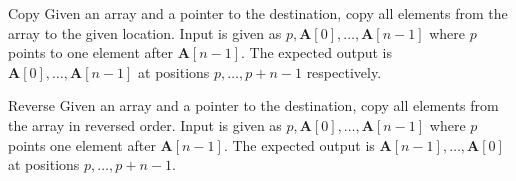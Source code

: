\documentclass[xcolor={usenames}]{beamer}
\begin{document}
  \begin{frame}{Copy}
  	Given an array and a pointer to the destination, copy all elements from the array to the given location. Input is given as $p, \textbf{A}[0], \dots, \textbf{A}[n-1]$ where $p$ points to one element after $\textbf{A}[n-1]$. The expected output is $\textbf{A}[0], \dots, \textbf{A}[n-1]$ at positions $p, \dots, p+n-1$ respectively.			
  	\begin{table}[h!]
		\centering
\end{table}
  \end{frame}
  \begin{frame}{Reverse}
  	Given an array and a pointer to the destination, copy all elements from the array in reversed order. Input is given as $p, \textbf{A}[0], \dots, \textbf{A}[n-1]$ where $p$ points one element after $\textbf{A}[n-1]$. The expected output is $\textbf{A}[n-1], \dots, \textbf{A}[0]$ at positions $p, \dots, p+n-1$.
  	\begin{table}[h!]
		\centering
	\end{table}
  \end{frame}
\end{document}
